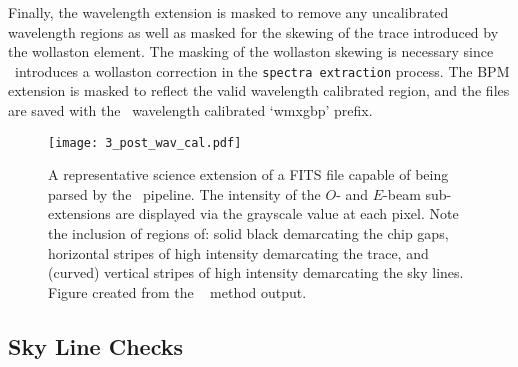 Finally, the wavelength extension is masked to remove any uncalibrated wavelength regions as well as masked for the skewing of the trace introduced by the wollaston element. The masking of the wollaston skewing is necessary since \polsalt\ introduces a wollaston correction in the \texttt{spectra extraction} process. The \gls{BPM} extension is masked to reflect the valid wavelength calibrated region, and the files are saved with the \polsalt\ wavelength calibrated `wmxgbp' prefix.

\begin{figure}[t]
    \centering
    \texttt{[image: 3\_post\_wav\_cal.pdf]}
    \caption{A representative science extension of a \gls{FITS} file capable of being parsed by the \polsalt\ pipeline. The intensity of the $O$- and $E$-beam sub-extensions are displayed via the grayscale value at each pixel. Note the inclusion of regions of: solid black demarcating the chip gaps, horizontal stripes of high intensity demarcating the trace, and (curved) vertical stripes of high intensity demarcating the sky lines. Figure created from the \stops\  method output.}
    \label{fig:polsalt_post_wav_cal}
\end{figure}

\pagebreak

\subsection{Sky Line Checks} \label{subsec:stops_skyline}



